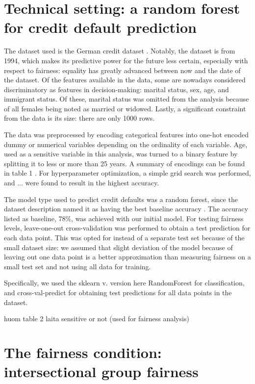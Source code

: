\documentclass{article}
\begin{document}
\section*{Technical setting: a random forest for credit default prediction}

The dataset used is the German credit dataset \cite{stanley}.
Notably, the dataset is from 1994, which makes its predictive power for the future 
less certain, especially with respect to fairness: equality has greatly advanced 
between now and the date of the dataset.
Of the features available in the data, some are nowadays considered 
discriminatory as features in decision-making: marital status, 
sex, age, and immigrant status.
Of these, marital status was omitted from the analysis because of all females being noted as 
married or widowed. Lastly, a significant constraint from the data 
is its size: there are only 1000 rows. 

The data was preprocessed by encoding categorical features into one-hot encoded 
dummy or numerical variables depending on the ordinality of each variable.
Age, used as a sensitive variable in this analysis, was turned to a binary feature by splitting it to less or more than 25 years. 
A summary of encodings can be found in table 1 \cite{stanley}. For hyperparameter 
optimization, a simple grid search was performed, and ... were found to result in the highest accuracy.

The model type used to predict credit defaults was a random forest, since the 
dataset description named it as having the best baseline accuracy \cite{stanley}.
The accuracy listed as baseline, 78\%, was achieved with our initial model.
For testing fairness levels, leave-one-out cross-validation was performed to obtain 
a test prediction for each data point. This was opted for instead of a separate test set 
because of the small dataset size: we assumed that slight deviation of the model because of leaving out one data point 
is a better approximation than measuring fairness on a small test set and not using all data for training.

Specifically, we used the sklearn v. version here RandomForest \cite{stanley} for classification, 
and cross-val-predict for obtaining test predictions for all data points in 
the dataset.

huom table 2 laita sensitive or not (used for fairness analysis)

\section*{The fairness condition: intersectional group fairness}
\end{document}
